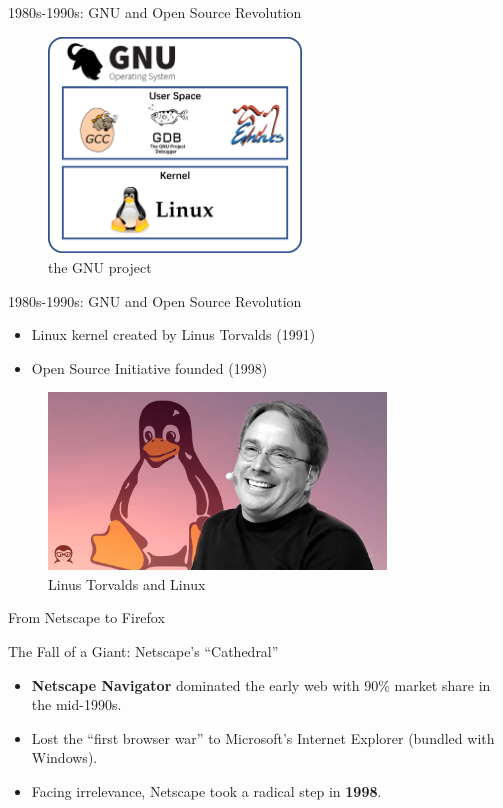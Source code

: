 \documentclass{beamer}
\begin{document}
\begin{frame}[t]{1980s-1990s: GNU and Open Source Revolution}
    \begin{figure}
        \includegraphics[width=0.6\textwidth]{images/gnu4.png}
        \caption{the GNU project}
    \end{figure}
\end{frame}
\begin{frame}[t]{1980s-1990s: GNU and Open Source Revolution}
    \begin{itemize}
        \item Linux kernel created by Linus Torvalds (1991)
        \item Open Source Initiative founded (1998)
    \end{itemize}
    \begin{figure}
        \includegraphics[width=0.8\textwidth]{images/Linus-Torvalds-Linux.png}
        \caption{Linus Torvalds and Linux}
    \end{figure}
\end{frame}

\begin{frame}[t]{From Netscape to Firefox}

\begin{block}{The Fall of a Giant: Netscape's ``Cathedral''}
\begin{itemize}
    \item \textbf{Netscape Navigator} dominated the early web with 90\% market share in the mid-1990s.
    \item Lost the ``first browser war'' to Microsoft's Internet Explorer (bundled with Windows).
    \item Facing irrelevance, Netscape took a radical step in \textbf{1998}.
\end{itemize}
\end{block}
\end{frame}
\end{document}
